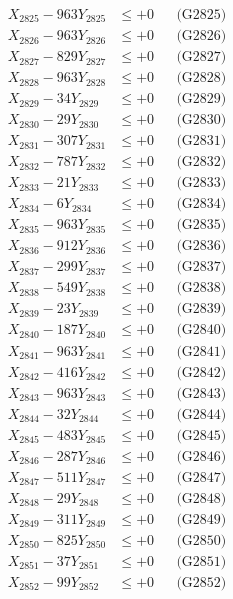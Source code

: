 \documentclass[a4paper,10pt]{article}
\begin{document}
{\begin{align}
X_{2825} - 963Y_{2825} &\leq +0 && \text{(G2825)} \\
X_{2826} - 963Y_{2826} &\leq +0 && \text{(G2826)} \\
X_{2827} - 829Y_{2827} &\leq +0 && \text{(G2827)} \\
X_{2828} - 963Y_{2828} &\leq +0 && \text{(G2828)} \\
X_{2829} - 34Y_{2829} &\leq +0 && \text{(G2829)} \\
X_{2830} - 29Y_{2830} &\leq +0 && \text{(G2830)} \\
\allowbreak
X_{2831} - 307Y_{2831} &\leq +0 && \text{(G2831)} \\
X_{2832} - 787Y_{2832} &\leq +0 && \text{(G2832)} \\
X_{2833} - 21Y_{2833} &\leq +0 && \text{(G2833)} \\
X_{2834} - 6Y_{2834} &\leq +0 && \text{(G2834)} \\
X_{2835} - 963Y_{2835} &\leq +0 && \text{(G2835)} \\
X_{2836} - 912Y_{2836} &\leq +0 && \text{(G2836)} \\
X_{2837} - 299Y_{2837} &\leq +0 && \text{(G2837)} \\
X_{2838} - 549Y_{2838} &\leq +0 && \text{(G2838)} \\
X_{2839} - 23Y_{2839} &\leq +0 && \text{(G2839)} \\
X_{2840} - 187Y_{2840} &\leq +0 && \text{(G2840)} \\
\allowbreak
X_{2841} - 963Y_{2841} &\leq +0 && \text{(G2841)} \\
X_{2842} - 416Y_{2842} &\leq +0 && \text{(G2842)} \\
X_{2843} - 963Y_{2843} &\leq +0 && \text{(G2843)} \\
X_{2844} - 32Y_{2844} &\leq +0 && \text{(G2844)} \\
X_{2845} - 483Y_{2845} &\leq +0 && \text{(G2845)} \\
X_{2846} - 287Y_{2846} &\leq +0 && \text{(G2846)} \\
X_{2847} - 511Y_{2847} &\leq +0 && \text{(G2847)} \\
X_{2848} - 29Y_{2848} &\leq +0 && \text{(G2848)} \\
X_{2849} - 311Y_{2849} &\leq +0 && \text{(G2849)} \\
X_{2850} - 825Y_{2850} &\leq +0 && \text{(G2850)} \\
\allowbreak
X_{2851} - 37Y_{2851} &\leq +0 && \text{(G2851)} \\
X_{2852} - 99Y_{2852} &\leq +0 && \text{(G2852)} \\

\end{align}}
\end{document}
